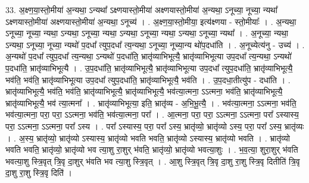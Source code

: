 \documentclass[17pt]{extarticle}
\begin{document}
33. अ॒क्ष्ण॒या॒स्तो॒मीया॑ अ॒न्यथा॒ ऽन्यथा᳚ ऽक्ष्णयास्तो॒मीया॑ अक्ष्णयास्तो॒मीया॑ अ॒न्यथा॒ ऽनूच्या॒ नूच्या॒ न्यथा᳚ ऽक्ष्णयास्तो॒मीया॑ अक्ष्णयास्तो॒मीया॑ अ॒न्यथा॒ ऽनूच्य॑ । . अ॒क्ष्ण॒या॒स्तो॒मीया॒ इत्य॑क्ष्णया - स्तो॒मीयाः᳚ । . अ॒न्यथा॒ ऽनूच्या॒ नूच्या॒ न्यथा॒ ऽन्यथा॒ ऽनूच्या॒ न्यथा॒ ऽन्यथा॒ ऽनूच्या॒ न्यथा॒ ऽन्यथा॒ ऽनूच्या॒ न्यथा᳚ । . अ॒नूच्या॒ न्यथा॒ ऽन्यथा॒ ऽनूच्या॒ नूच्या॒ न्यथो॑ प॒दधा᳚ त्युप॒दधा᳚ त्य॒न्यथा॒ ऽनूच्या॒ नूच्या॒न्य थो॑प॒दधा॑ति । . अ॒नूच्येत्य॑नु - उच्य॑ । . अ॒न्यथो॑ प॒दधा᳚ त्युप॒दधा᳚ त्य॒न्यथा॒ ऽन्यथो॑ प॒दधा॑ति॒ भ्रातृ॑व्याभिभूत्यै॒ भ्रातृ॑व्याभिभूत्या उप॒दधा᳚ त्य॒न्यथा॒ ऽन्यथो॑ प॒दधा॑ति॒ भ्रातृ॑व्याभिभूत्यै । . उ॒प॒दधा॑ति॒ भ्रातृ॑व्याभिभूत्यै॒ भ्रातृ॑व्याभिभूत्या उप॒दधा᳚ त्युप॒दधा॑ति॒ भ्रातृ॑व्याभिभूत्यै॒ भव॑ति॒ भव॑ति॒ भ्रातृ॑व्याभिभूत्या उप॒दधा᳚ त्युप॒दधा॑ति॒ भ्रातृ॑व्याभिभूत्यै॒ भव॑ति । . उ॒प॒दधा॒तीत्यु॑प - दधा॑ति । . भ्रातृ॑व्याभिभूत्यै॒ भव॑ति॒ भव॑ति॒ भ्रातृ॑व्याभिभूत्यै॒ भ्रातृ॑व्याभिभूत्यै॒ भव॑त्या॒त्मना॒ ऽऽत्मना॒ भव॑ति॒ भ्रातृ॑व्याभिभूत्यै॒ भ्रातृ॑व्याभिभूत्यै॒ भव॑ त्या॒त्मना᳚ । . भ्रातृ॑व्याभिभूत्या॒ इति॒ भ्रातृ॑व्य - अ॒भि॒भू॒त्यै॒ । . भव॑त्या॒त्मना॒ ऽऽत्मना॒ भव॑ति॒ भव॑त्या॒त्मना॒ परा॒ परा॒ ऽऽत्मना॒ भव॑ति॒ भव॑त्या॒त्मना॒ परा᳚ । . आ॒त्मना॒ परा॒ परा॒ ऽऽत्मना॒ ऽऽत्मना॒ परा᳚ ऽस्यास्य॒ परा॒ ऽऽत्मना॒ ऽऽत्मना॒ परा᳚ ऽस्य । . परा᳚ ऽस्यास्य॒ परा॒ परा᳚ ऽस्य॒ भ्रातृ॑व्यो॒ भ्रातृ॑व्यो ऽस्य॒ परा॒ परा᳚ ऽस्य॒ भ्रातृ॑व्यः । . अ॒स्य॒ भ्रातृ॑व्यो॒ भ्रातृ॑व्यो ऽस्यास्य॒ भ्रातृ॑व्यो भवति भवति॒ भ्रातृ॑व्यो ऽस्यास्य॒ भ्रातृ॑व्यो भवति । . भ्रातृ॑व्यो भवति भवति॒ भ्रातृ॑व्यो॒ भ्रातृ॑व्यो भव त्या॒शु रा॒शुर् भ॑वति॒ भ्रातृ॑व्यो॒ भ्रातृ॑व्यो भवत्या॒शुः । . भ॒व॒त्या॒ शुरा॒शुर् भ॑वति भवत्या॒शु स्त्रि॒वृत् त्रि॒वृ दा॒शुर् भ॑वति भव त्या॒शु स्त्रि॒वृत् । . आ॒शु स्त्रि॒वृत् त्रि॒वृ दा॒शु रा॒शु स्त्रि॒वृ दितीति॑ त्रि॒वृ दा॒शु रा॒शु स्त्रि॒वृ दिति॑ । \newline
\end{document}
